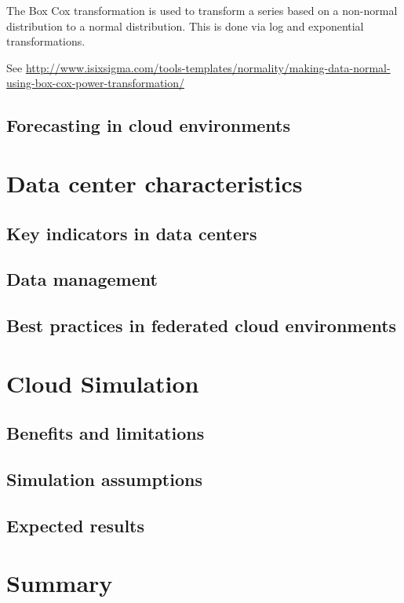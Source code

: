 The Box Cox transformation is used to transform a series based on a non-normal distribution to a normal distribution. This is done via log and exponential transformations. 

See \url{http://www.isixsigma.com/tools-templates/normality/making-data-normal-using-box-cox-power-transformation/}



\subsection{Forecasting in cloud environments}



\section{Data center characteristics}

\subsection{Key indicators in data centers}

\subsection{Data management}

\subsection{Best practices in federated cloud environments}



\section{Cloud Simulation}

\subsection{Benefits and limitations}

\subsection{Simulation assumptions}

\subsection{Expected results}



\section{Summary}



